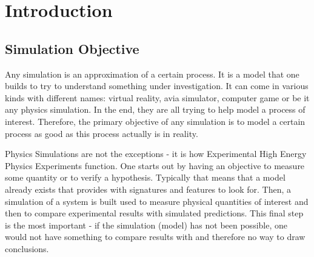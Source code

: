 \section{Introduction} \label{section:simulations_introduction}

\subsection{Simulation Objective} \label{subsection:simulations_introduction_objective}
Any simulation is an approximation of a certain process. It is a model that one builds to try to understand something under investigation. It can come in various kinds with different names: virtual reality, avia simulator, computer game or be it any physics simulation. In the end, they are all trying to help model a process of interest. Therefore, the primary objective of any simulation is to model a certain process as good as this process actually is in reality.

Physics Simulations are not the exceptions - it is how Experimental High Energy Physics Experiments function. One starts out by having an objective to measure some quantity or to verify a hypothesis. Typically that means that a model already exists that provides with signatures and features to look for. Then, a simulation of a system is built used to measure physical quantities of interest and then to compare experimental results with simulated predictions. This final step is the most important - if the simulation (model) has not been possible, one would not have something to compare results with and therefore no way to draw conclusions.

